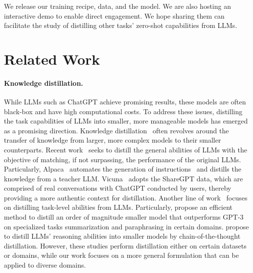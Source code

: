{We release our training recipe, data, and the \longname model. We are also hosting an interactive demo to enable direct engagement. We hope sharing them can facilitate the study of distilling other tasks' zero-shot capabilities from LLMs.

}
\section{Related Work}

\paragraph{Knowledge distillation.}
While LLMs such as ChatGPT achieve promising results, these models are often black-box and have high computational costs.
To address these issues, distilling the task capabilities of LLMs into smaller, more manageable models has emerged as a promising direction.
Knowledge distillation~\citep{hinton2015distilling} often revolves around the transfer of knowledge from larger, more complex models to their smaller counterparts.
Recent work~\citep{alpaca,vicuna-2023,peng2023instruction} seeks to distill the general abilities of LLMs with the objective of matching, if not surpassing, the performance of the original LLMs.
Particularly, Alpaca~\citep{alpaca} automates the generation of instructions~\citep{wang2022self} and distills the knowledge from a teacher LLM.
Vicuna~\citep{vicuna-2023} adopts the ShareGPT data, which are comprised of real conversations with ChatGPT conducted by users, thereby providing a more authentic context for distillation.
Another line of work~\citep{smith2022language,jung2023impossible,hsieh-etal-2023-distilling,gu2023distilling} focuses on distilling task-level abilities from LLMs.
Particularly, \citet{jung2023impossible} propose an efficient method to distill an order of magnitude smaller model that outperforms GPT-3 on specialized tasks summarization and paraphrasing in certain domains.
\citet{hsieh-etal-2022-converting} propose to distill LLMs' reasoning abilities into smaller models by chain-of-the-thought distillation.
However, these studies perform distillation either on certain datasets or domains, while our work focuses on a more general formulation that can be applied to diverse domains.

